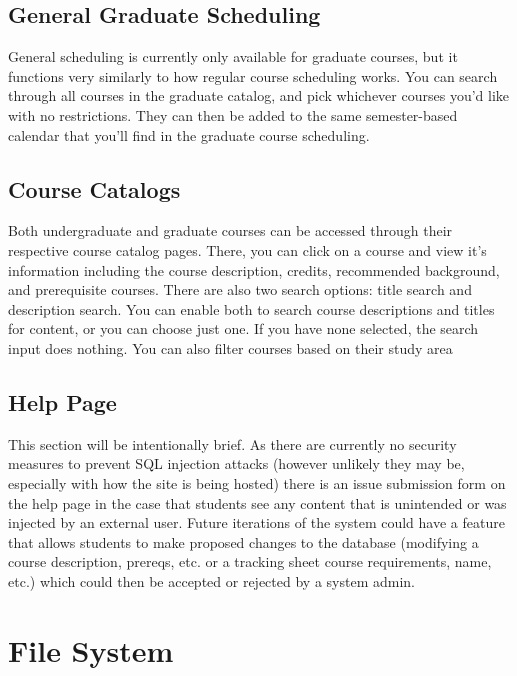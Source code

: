 \documentclass[12pt]{article}
\begin{document}
		\subsection{General Graduate Scheduling}
			General scheduling is currently only available for graduate courses, but it functions very similarly to how regular course scheduling works. You can search through all courses in the graduate catalog, and pick whichever courses you'd like with no restrictions. They can then be added to the same semester-based calendar that you'll find in the graduate course scheduling. 
		
		\subsection{Course Catalogs}
			Both undergraduate and graduate courses can be accessed through their respective course catalog pages. There, you can click on a course and view it's information including the course description, credits, recommended background, and prerequisite courses. There are also two search options: title search and description search. You can enable both to search course descriptions and titles for content, or you can choose just one. If you have none selected, the search input does nothing. You can also filter courses based on their study area
		
		\subsection{Help Page}
			This section will be intentionally brief. As there are currently no security measures to prevent SQL injection attacks (however unlikely they may be, especially with how the site is being hosted) there is an issue submission form on the help page in the case that students see any content that is unintended or was injected by an external user. Future iterations of the system could have a feature that allows students to make proposed changes to the database (modifying a course description, prereqs, etc. or a tracking sheet course requirements, name, etc.) which could then be accepted or rejected by a system admin.

	\pagebreak
	\section{File System}
\end{document}
